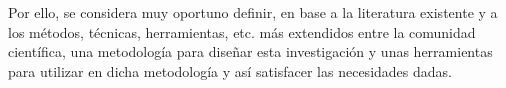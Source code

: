 Por ello, se considera muy oportuno definir, en base a la literatura existente y a los métodos, técnicas, herramientas, etc. más extendidos entre la comunidad científica, una metodología para diseñar esta investigación y unas herramientas para utilizar en dicha metodología y así satisfacer las necesidades dadas.

